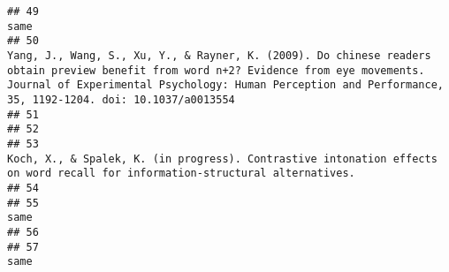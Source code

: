\documentclass[
  english,
  man]{apa6}
\begin{document}
\begin{verbatim}
## 49                                                                                                                                                                                                                                                                                                                 same
## 50                                                                    Yang, J., Wang, S., Xu, Y., & Rayner, K. (2009). Do chinese readers obtain preview benefit from word n+2? Evidence from eye movements. Journal of Experimental Psychology: Human Perception and Performance, 35, 1192-1204. doi: 10.1037/a0013554
## 51                                                                                                                                                                                                                                                                                                                     
## 52                                                                                                                                                                                                                                                                                                                     
## 53                                                                                                                                                                                         Koch, X., & Spalek, K. (in progress). Contrastive intonation effects on word recall for information-structural alternatives.
## 54                                                                                                                                                                                                                                                                                                                     
## 55                                                                                                                                                                                                                                                                                                                 same
## 56                                                                                                                                                                                                                                                                                                                     
## 57                                                                                                                                                                                                                                                                                                                 same

\end{verbatim}
\end{document}
